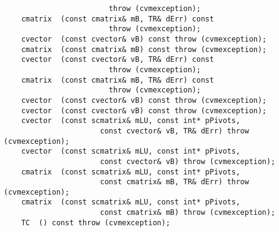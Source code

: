 \verb"                        throw (cvmexception);"\\
\verb"    cmatrix "\verb" (const cmatrix& mB, TR& dErr) const"\\
\verb"                        throw (cvmexception);"\\
\verb"    cvector "\verb" (const cvector& vB) const throw (cvmexception);"\\
\verb"    cmatrix "\verb" (const cmatrix& mB) const throw (cvmexception);"\\
\verb"    cvector "\verb" (const cvector& vB, TR& dErr) const"\\
\verb"                        throw (cvmexception);"\\
\verb"    cmatrix "\verb" (const cmatrix& mB, TR& dErr) const"\\
\verb"                        throw (cvmexception);"\\
\verb"    cvector "\verb" (const cvector& vB) const throw (cvmexception);"\\
\verb"    cvector "\verb" (const cvector& vB) const throw (cvmexception);"\\
\verb"    cvector "\verb" (const scmatrix& mLU, const int* pPivots,"\\
\verb"                      const cvector& vB, TR& dErr) throw (cvmexception);"\\
\verb"    cvector "\verb" (const scmatrix& mLU, const int* pPivots,"\\
\verb"                      const cvector& vB) throw (cvmexception);"\\
\verb"    cmatrix "\verb" (const scmatrix& mLU, const int* pPivots,"\\
\verb"                      const cmatrix& mB, TR& dErr) throw (cvmexception);"\\
\verb"    cmatrix "\verb" (const scmatrix& mLU, const int* pPivots,"\\
\verb"                      const cmatrix& mB) throw (cvmexception);"\\
\verb"    TC "\verb" () const throw (cvmexception);"\\
